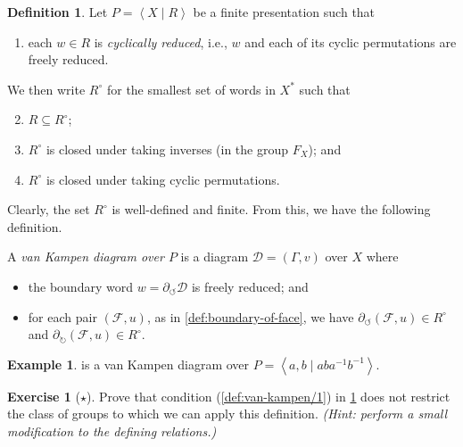 \documentclass[11pt,a4paper,reqno]{amsart}
\theoremstyle{plain}
\theoremstyle{definition}
\newtheorem{definition}[theorem]{Definition}
\theoremstyle{definition}
\newtheorem{exercise}[theorem]{Exercise}
\newtheorem{example}[theorem]{Example}
\newcommand\exerciseLevelEasy{$\star$}
\begin{document}
\begin{definition}\label{def:van-kampen}
	Let $P = \left\langle X \mid R\right\rangle$ be a finite presentation such that
	\begin{enumerate}[leftmargin=2em]
		\item\label{def:van-kampen/1} each $w\in R$ is \textit{cyclically reduced}, i.e., $w$ and each of its cyclic permutations are freely reduced.
	\end{enumerate}
	We then write $R^\circ$ for the smallest set of words in $X^*$ such that
	\begin{enumerate}[leftmargin=2em]\setcounter{enumi}{1}
		\item\label{def:van-kampen/2} $R\subseteq R^\circ$;
		\item\label{def:van-kampen/3} $R^\circ$ is closed under taking inverses (in the group $F_X$); and
		\item\label{def:van-kampen/4} $R^\circ$ is closed under taking cyclic permutations.
	\end{enumerate}
	Clearly, the set $R^\circ$ is well-defined and finite. From this, we have the following definition.

	\hrulefill

	A \emph{van Kampen diagram over $P$} is a diagram $\mathcal D = (\Gamma,v)$ over $X$ where
	\begin{itemize}[leftmargin=2em]
		\item the boundary word $w = \partial_{\circlearrowleft} \mathcal D$ is freely reduced; and
		\item for each pair $(\mathcal F,u)$, as in \cref{def:boundary-of-face}, we have $\partial_{\circlearrowleft} (\mathcal F,u)\in R^\circ$ and $\partial_{\circlearrowright} (\mathcal F,u) \in R^\circ$.
	\end{itemize}
\end{definition}

\begin{example}
	 is a van Kampen diagram over $P = \left\langle a,b \mid aba^{-1}b^{-1} \right\rangle$.
\end{example}

\begin{exercise}[\exerciseLevelEasy]
	Prove that condition (\ref{def:van-kampen/1}) in \cref{def:van-kampen} does not restrict the class of groups to which we can apply this definition. \textit{(Hint: perform a small modification to the defining relations.)}
\end{exercise}
\end{document}
